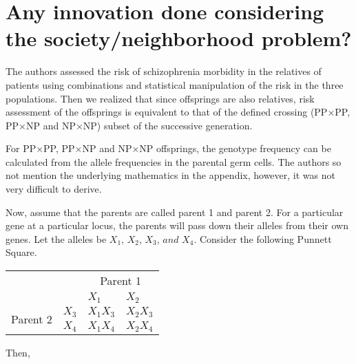 \documentclass{article}
\begin{document}
\section{Any innovation done considering the society/neighborhood problem?}

The authors assessed the risk of schizophrenia morbidity in the relatives of patients using combinations and statistical manipulation of the risk in the three populations. Then we realized that since offsprings are also relatives, risk assessment of the offsprings is equivalent to that of the defined crossing (PP×PP, PP×NP and NP×NP) subset of the successive generation.
  
For PP×PP, PP×NP and NP×NP offsprings, the genotype frequency can be calculated from the allele frequencies in the parental germ cells. The authors so not mention the underlying mathematics in the appendix, however, it was not very difficult to derive.
  
Now, assume that the parents are called parent 1 and parent 2. For a particular gene at a particular locus, the parents will pass down their alleles from their own genes. Let the alleles be $X_1,\,X_2,\, X_3,\,\textit{and }X_4$. Consider the following Punnett Square.

\begin{table}[h]
\centering
\label{tab:my-table}
\begin{tabular}{llll}
                                               &                            & \multicolumn{2}{c}{Parent 1}                                   \\ \cline{3-4} 
                                               & \multicolumn{1}{l|}{}      & \multicolumn{1}{l|}{$X_1$}        & \multicolumn{1}{l|}{$X_2$} \\ \cline{2-4} 
\multicolumn{1}{c|}{\multirow{2}{*}{Parent 2}} & \multicolumn{1}{l|}{$X_3$} & \multicolumn{1}{l|}{$X_{1}X_{3}$} & \multicolumn{1}{l|}{$X_{2}X_{3}$}    \\ \cline{2-4} 
\multicolumn{1}{c|}{}                          & \multicolumn{1}{l|}{$X_4$} & \multicolumn{1}{l|}{$X_{1}X_{4}$}           & \multicolumn{1}{l|}{$X_{2}X_{4}$}    \\ \cline{2-4} 
\end{tabular}
\end{table}

Then,
\end{document}
